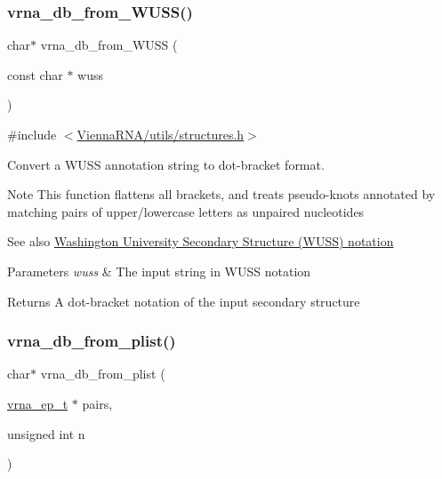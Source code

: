 \subsubsection{\texorpdfstring{vrna\+\_\+db\+\_\+from\+\_\+\+W\+U\+S\+S()}{vrna\_db\_from\_WUSS()}}
{\footnotesize\ttfamily char$\ast$ vrna\+\_\+db\+\_\+from\+\_\+\+W\+U\+SS (\begin{DoxyParamCaption}\item[{const char $\ast$}]{wuss }\end{DoxyParamCaption})}



{\ttfamily \#include $<$\hyperlink{utils_2structures_8h}{Vienna\+R\+N\+A/utils/structures.\+h}$>$}



Convert a W\+U\+SS annotation string to dot-\/bracket format. 

\begin{DoxyNote}{Note}
This function flattens all brackets, and treats pseudo-\/knots annotated by matching pairs of upper/lowercase letters as unpaired nucleotides
\end{DoxyNote}
\begin{DoxySeeAlso}{See also}
\hyperlink{rna_structure_notations_wuss-notation}{Washington University Secondary Structure (W\+U\+SS) notation}
\end{DoxySeeAlso}

\begin{DoxyParams}{Parameters}
{\em wuss} & The input string in W\+U\+SS notation \\
\hline
\end{DoxyParams}
\begin{DoxyReturn}{Returns}
A dot-\/bracket notation of the input secondary structure 
\end{DoxyReturn}
\mbox{\label{group__struct__utils__dot__bracket_ga6a51a36b9245d0bac868c5cd172b9611}} 
\subsubsection{\texorpdfstring{vrna\+\_\+db\+\_\+from\+\_\+plist()}{vrna\_db\_from\_plist()}}
{\footnotesize\ttfamily char$\ast$ vrna\+\_\+db\+\_\+from\+\_\+plist (\begin{DoxyParamCaption}\item[{\hyperlink{group__struct__utils__plist_gab9ac98ab55ded9fb90043b024b915aca}{vrna\+\_\+ep\+\_\+t} $\ast$}]{pairs,  }\item[{unsigned int}]{n }\end{DoxyParamCaption})}



